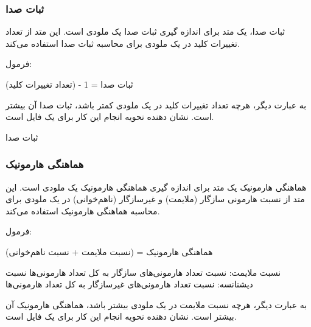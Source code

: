 \subsubsection{ ثبات صدا }

ثبات صدا، یک متد برای اندازه گیری ثبات صدا یک ملودی است. این متد از تعداد تغییرات کلید در یک ملودی برای محاسبه ثبات صدا استفاده می‌کند.

فرمول:

ثبات صدا = 1 - (تعداد تغییرات کلید)

به عبارت دیگر، هرچه تعداد تغییرات کلید در یک ملودی کمتر باشد، ثبات صدا آن بیشتر است.
 نشان دهنده نحویه انجام این کار برای یک فایل  است.


\begin{LTR}
      \begin{algorithm}
            \caption{ثبات صدا }
            \setmainfont{Times New Roman}
            \label{alg:analyze_tonal_stability}
            \begin{algorithmic}
            \end{algorithmic}
      \end{algorithm}
\end{LTR}

\subsubsection{ هماهنگی هارمونیک  }

هماهنگی هارمونیک یک متد برای اندازه گیری هماهنگی هارمونیک یک ملودی است. این متد از نسبت هارمونی سازگار (ملایمت) و غیرسازگار (نا‌هم‌خوانی) در یک ملودی برای محاسبه هماهنگی هارمونیک استفاده می‌کند.

فرمول:

هماهنگی هارمونیک = (نسبت ملایمت + نسبت نا‌هم‌خوانی)

نسبت ملایمت: نسبت تعداد هارمونی‌های سازگار به کل تعداد هارمونی‌ها
نسبت دیشنانسه: نسبت تعداد هارمونی‌های غیرسازگار به کل تعداد هارمونی‌ها

به عبارت دیگر، هرچه نسبت ملایمت در یک ملودی بیشتر باشد، هماهنگی هارمونیک آن بیشتر است.
 نشان دهنده نحویه انجام این کار برای یک فایل  است.

